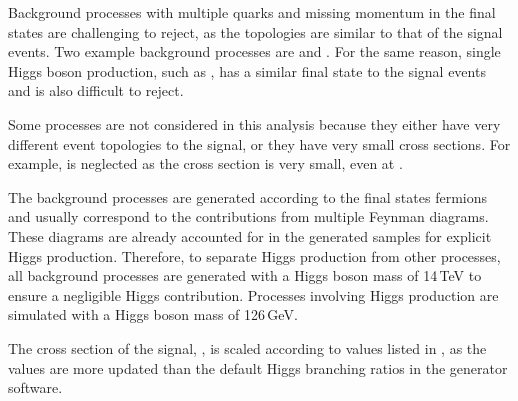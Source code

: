 
Background processes with multiple quarks and missing momentum in the final states are challenging to reject, as the topologies are similar to that of the signal events. Two example background processes are \eeTo{ \Pquark \Pquark \Pquark \Pquark \Pnu \APnu} and \HepProcess{\Pepm\Pphoton \to \Pnu \Pquark \Pquark \Pquark \Pquark}. For the same reason, single Higgs boson production, such as \eeTo{\Pquark \Pquark \PHiggs \Pnu \APnu}, has a similar final state to the signal events and is also difficult to reject.

Some processes are not considered in this analysis because they either have very different event topologies to the signal, or they have very small cross sections. For example,  \HepProcess{\Egamma   \to \Pquark \Pquark \PHiggs \Plepton} is neglected  as the cross section is very small, even at .

The background processes are generated according to the final states fermions and usually correspond to the contributions from multiple Feynman diagrams. These diagrams are already accounted for in the generated samples for explicit Higgs production.   Therefore, to separate Higgs production from other processes, all background processes are generated with a Higgs boson mass of 14\,TeV to ensure a negligible Higgs contribution. Processes involving Higgs production are simulated with a Higgs boson mass of 126\,GeV.


The cross section of the signal, \eeToHHbbWW, is scaled according to values listed in \cite{Dittmaier:2012vm}, as the values are more updated than the  default Higgs branching ratios in the generator software.


